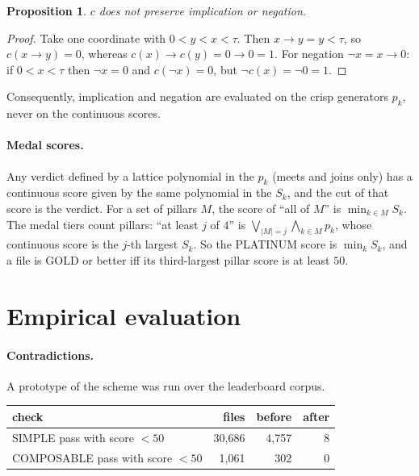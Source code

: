 \documentclass[11pt]{article}
\newtheorem{proposition}{Proposition}
\theoremstyle{remark}
\begin{document}
\begin{proposition}
$c$ does not preserve implication or negation.
\end{proposition}

\begin{proof}
Take one coordinate with $0 < y < x < \tau$. Then $x \to y = y < \tau$, so
$c(x \to y) = 0$, whereas $c(x) \to c(y) = 0 \to 0 = 1$. For negation
$\neg x = x \to 0$: if $0 < x < \tau$ then $\neg x = 0$ and $c(\neg x) = 0$, but
$\neg c(x) = \neg 0 = 1$.
\end{proof}

Consequently, implication and negation are evaluated on the crisp generators
$p_k$, never on the continuous scores.

\paragraph{Medal scores.} Any verdict defined by a lattice polynomial in the
$p_k$ (meets and joins only) has a continuous score given by the same
polynomial in the $S_k$, and the cut of that score is the verdict. For a set of
pillars $M$, the score of ``all of $M$'' is $\min_{k \in M} S_k$. The medal tiers
count pillars: ``at least $j$ of $4$'' is $\bigvee_{|M| = j} \bigwedge_{k \in M}
p_k$, whose continuous score is the $j$-th largest $S_k$. So the PLATINUM score
is $\min_k S_k$, and a file is GOLD or better iff its third-largest pillar score
is at least $50$.

\section{Empirical evaluation}

\paragraph{Contradictions.} A prototype of the scheme was run over the
leaderboard corpus.

\begin{center}
\begin{tabular}{lrrr}
\toprule
check & files & before & after \\
\midrule
SIMPLE pass with score $< 50$ & 30{,}686 & 4{,}757 & 8 \\
COMPOSABLE pass with score $< 50$ & 1{,}061 & 302 & 0 \\
\bottomrule
\end{tabular}
\end{center}
\end{document}
